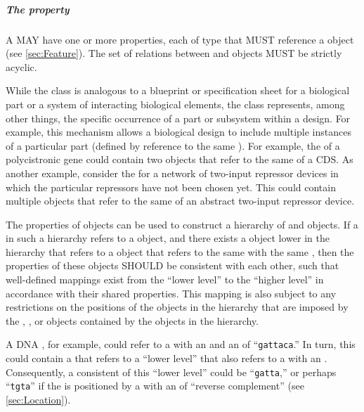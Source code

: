 \subparagraph{The  property}
\label{sec:hasFeature}

A  MAY have one or more  properties, each of type  that MUST reference a  object (see \ref{sec:Feature}). The set of relations between  and  objects MUST be strictly acyclic.

While the  class is analogous to a blueprint or specification sheet for a biological part or a system of interacting biological elements, the  class represents, among other things, the specific occurrence of a part or subsystem within a design.  For example, this mechanism allows a biological design to include multiple instances of a particular part (defined by reference to the same ). For example, the  of a polycistronic gene could contain two  objects that refer to the same  of a CDS.  As another example, consider the  for a network of two-input repressor devices in which the particular repressors have not been chosen yet. This  could contain multiple  objects that refer to the same  of an abstract two-input repressor device.

The  properties of  objects can be used to construct a hierarchy of  and  objects.  If a  in such a hierarchy refers to a  object, and there exists a  object lower in the hierarchy that refers to a  object that refers to the same  with the same , then the  properties of these  objects SHOULD be consistent with each other, such that well-defined mappings exist from the ``lower level''  to the ``higher level''  in accordance with their shared  properties. This mapping is also subject to any restrictions on the positions of the  objects in the hierarchy that are imposed by the , , or  objects contained by the  objects in the hierarchy.

A DNA , for example, could refer to a  with an   and an   of ``{\tt gattaca}.'' In turn, this  could contain a  that refers to a ``lower level''   that also refers to a  with an  . Consequently, a consistent   of this ``lower level''  could be ``{\tt gatta},'' or perhaps ``{\tt tgta}'' if the  is positioned by a  with an  of ``reverse complement'' (see \ref{sec:Location}).

